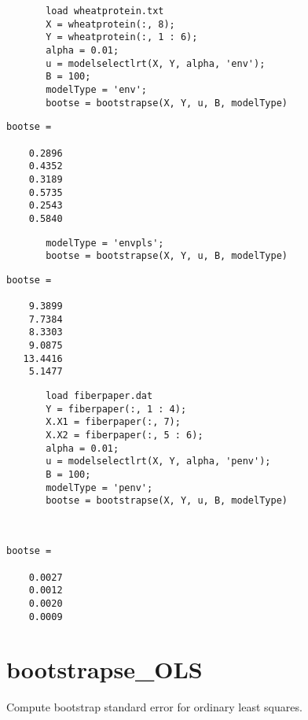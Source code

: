 \documentclass[a4paper,11pt,openany]{memoir}
\begin{document}
\begin{verbatim}       load wheatprotein.txt
       X = wheatprotein(:, 8);
       Y = wheatprotein(:, 1 : 6);
       alpha = 0.01;
       u = modelselectlrt(X, Y, alpha, 'env');
       B = 100;
       modelType = 'env';
       bootse = bootstrapse(X, Y, u, B, modelType)\end{verbatim}
        \color{lightgray}\ttfamily 
        \begin{verbatim}
bootse =

    0.2896
    0.4352
    0.3189
    0.5735
    0.2543
    0.5840
\end{verbatim} 
\rmfamily
\color{black}

\begin{verbatim}       modelType = 'envpls';
       bootse = bootstrapse(X, Y, u, B, modelType)
       \end{verbatim}
   
        \color{lightgray}\ttfamily \begin{verbatim}
bootse =

    9.3899
    7.7384
    8.3303
    9.0875
   13.4416
    5.1477
\end{verbatim} \rmfamily

\color{black}
\begin{verbatim}       load fiberpaper.dat
       Y = fiberpaper(:, 1 : 4);
       X.X1 = fiberpaper(:, 7);
       X.X2 = fiberpaper(:, 5 : 6);
       alpha = 0.01;
       u = modelselectlrt(X, Y, alpha, 'penv');
       B = 100;
       modelType = 'penv';
       bootse = bootstrapse(X, Y, u, B, modelType)
       \end{verbatim}
    

        \color{lightgray}\ttfamily \begin{verbatim}


bootse =

    0.0027
    0.0012
    0.0020
    0.0009

\end{verbatim} \rmfamily
\color{black}
    

\newpage

\rmfamily
\color{black}\section{bootstrapse\_OLS}

\begin{par}
Compute bootstrap standard error for ordinary least squares.
\end{par} \vspace{1em}
\end{document}
